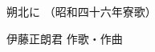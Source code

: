 \documentclass[10pt,b5j]{tarticle} %
\begin{document}
\begin{minipage}[c]{0.7\hsize} %
    \begin{center}
        {\LARGE
            朔北に %
        }
        {\small 
            （昭和四十六年寮歌） %
        }
    \end{center}
\end{minipage}
\begin{minipage}[c]{0.3\hsize} %
    \begin{flushright} %
        伊藤正朗君 作歌・作曲 %
    \end{flushright}
\end{minipage}
\end{document}
